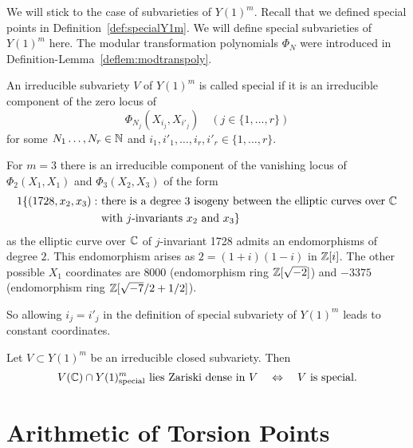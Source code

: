 We will stick to the case of subvarieties of $Y(1)^m$.
Recall that we defined special points in
Definition~\ref{def:specialY1m}. We will define special subvarieties
of $Y(1)^m$ here. The modular transformation polynomials $\Phi_N$
were introduced in Definition-Lemma~\ref{deflem:modtranspoly}. 

\begin{definition}
  An irreducible subvariety $V$ of $Y(1)^m$ is called special if it is
  an irreducible component of the zero locus of
  \begin{equation*}
    \Phi_{N_j}(X_{i_j},X_{i'_j}) \quad (j\in \{1,\ldots,r\})
  \end{equation*}
  for some  $N_1\ldots,N_r\in{\mathbb{N}}$ and $i_1,i'_1,\ldots,i_r,i'_r\in
  \{1,\ldots,r\}$. 
\end{definition}

\begin{example}
  For $m=3$ there is an irreducible component of the vanishing locus of
  $\Phi_2(X_1,X_1)$ and $\Phi_3(X_2,X_3)$ of the form
  \begin{alignat*}1
    \{(1728,x_2,x_3) : \,\,&\text{there is a degree $3$ isogeny between
      the elliptic curves over $\IC$}\\ &\text{with $j$-invariants $x_2$ and $x_3$}\}
  \end{alignat*}
  as the elliptic curve over ${\mathbb{C}}$  of $j$-invariant 1728
  admits an endomorphisms of degree $2$. This endomorphism arises as
  $2 = (1+i)(1-i)$ in ${\mathbb{Z}}[i]$. The other possible $X_1$ 
  coordinates are $8000$ (endomorphism ring ${\mathbb{Z}}[\sqrt{-2}]$) and
  $-3375$ (endomorphism ring ${\mathbb{Z}}[\sqrt{-7}/2+1/2]$).

  So allowing $i_j=i'_j$ in the definition of special subvariety of
  $Y(1)^m$ leads to constant coordinates. 
\end{example}

\begin{theorem}
  Let $V\subset Y(1)^m$ be an irreducible closed subvariety. Then
  \begin{equation*}
    V({\mathbb{C}}) \cap Y(1)^m_{\mathrm{special}} \text{ lies Zariski dense in
      $V$}\quad\Leftrightarrow \quad
    \text{$V$ is special.}
  \end{equation*}    
\end{theorem}

\section{Arithmetic of Torsion Points}

